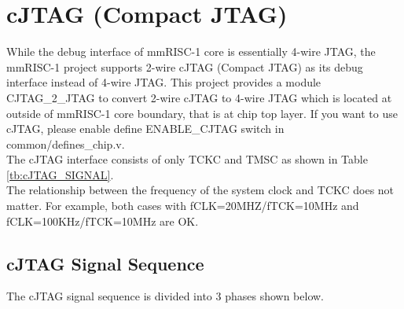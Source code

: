 \section{cJTAG (Compact JTAG)}
\label{sec:cJTAG}

While the debug interface of mmRISC-1 core is essentially 4-wire JTAG, the mmRISC-1 project supports 2-wire cJTAG (Compact JTAG) as its debug interface instead of 4-wire JTAG. This project provides a module CJTAG\_2\_JTAG to convert 2-wire cJTAG to 4-wire JTAG which is located at outside of mmRISC-1 core boundary, that is at chip top layer. If you want to use cJTAG, please enable \textasciigrave define ENABLE\_CJTAG switch in common/defines\_chip.v.\\
The cJTAG interface consists of only TCKC and TMSC as shown in Table \ref{tb:cJTAG_SIGNAL}.\\
The relationship between the frequency of the system clock and TCKC does not matter. For example, both cases with fCLK=20MHZ/fTCK=10MHz and fCLK=100KHz/fTCK=10MHz are OK.

\begin{table}[hbtp]
    \caption{Signal of cJTAG Interface}
    \label{tb:cJTAG_SIGNAL}
\end{table}

\subsection{cJTAG Signal Sequence}
The cJTAG signal sequence is divided into 3 phases shown below.

